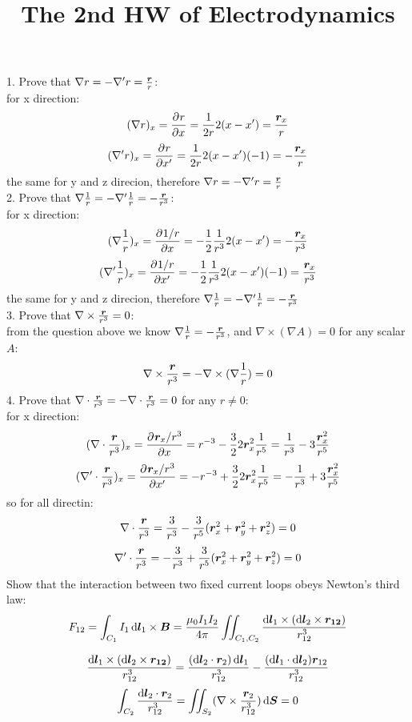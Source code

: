 \documentclass[UTF8,9pt]{ctexart}
\title{The 2nd HW of Electrodynamics}
\begin{document}
 
\maketitle
{}
1. Prove that $\nabla r=-\nabla'r=\frac{\bm{r}}{r}$:\\
for x direction:
$$(\nabla r)_x=\frac{\partial^{} r}{\partial {x}^{}}=\frac{1}{2r}2(x-x')=\frac{\bm{r}_x}{r}$$
$$(\nabla' r)_x=\frac{\partial^{} r}{\partial {x'}^{}}=\frac{1}{2r}2(x-x')(-1)=-\frac{\bm{r}_x}{r}$$
the same for y and z direcion, therefore $\nabla r=-\nabla'r=\frac{\bm{r}}{r}$\\
2. Prove that $\nabla \frac{1}{r}=-\nabla'\frac{1}{r}=-\frac{\bm{r}}{r^3}$:\\
for x direction:
$$(\nabla \frac{1}{r})_x=\frac{\partial^{} 1/r}{\partial {x}^{}}=-\frac{1}{2}\frac{1}{r^3}2(x-x')=-\frac{\bm{r}_x}{r^3}$$
$$(\nabla' \frac{1}{r})_x=\frac{\partial^{} 1/r}{\partial {x'}^{}}=-\frac{1}{2}\frac{1}{r^3}2(x-x')(-1)=\frac{\bm{r}_x}{r^3}$$
the same for y and z direcion, therefore $\nabla \frac{1}{r}=-\nabla'\frac{1}{r}=-\frac{\bm{r}}{r^3}$\\
3. Prove that $\nabla \times \frac{\bm{r}}{r^3}=0$:\\
from the question above we know $\nabla \frac{1}{r}=-\frac{\bm{r}}{r^3}$, and $\nabla \times (\nabla A)=0$ for any scalar $A$:
$$\nabla \times \frac{\bm{r}}{r^3}=-\nabla \times (\nabla \frac{1}{r})=0$$
4. Prove that $\nabla \cdot \frac{\bm{r}}{r^3}=-\nabla \cdot \frac{\bm{r}}{r^3}=0$ for any $r\neq 0$:\\
for x direction:
$$(\nabla \cdot \frac{\bm{r}}{r^3})_x=\frac{\partial^{} \bm{r}_x/r^3}{\partial {x}^{}}=r^{-3}-\frac{3}{2}2\bm{r}_x^2\frac{1}{r^5}=\frac{1}{r^3}-3\frac{\bm{r}_x^2}{r^5}$$
$$(\nabla' \cdot \frac{\bm{r}}{r^3})_x=\frac{\partial^{} \bm{r}_x/r^3}{\partial {x'}^{}}=-r^{-3}+\frac{3}{2}2\bm{r}_x^2\frac{1}{r^5}=-\frac{1}{r^3}+3\frac{\bm{r}_x^2}{r^5}$$
so for all directin:
$$\nabla \cdot \frac{\bm{r}}{r^3} = \frac{3}{r^3}-\frac{3}{r^5}(\bm{r}_x^2+\bm{r}_y^2+\bm{r}_z^2)=0$$
$$\nabla' \cdot \frac{\bm{r}}{r^3} = -\frac{3}{r^3}+\frac{3}{r^5}(\bm{r}_x^2+\bm{r}_y^2+\bm{r}_z^2)=0$$
Show that the interaction between two fixed current loops obeys Newton’s third law:
$$F_{12}=\int_{C_1} I_1\mathop{}\!\mathrm{d} \bm{l}_1\times \bm{B}=\frac{\mu_0I_1I_2}{4\pi}\iint_{C_1,C_2}\frac{\mathop{}\!\mathrm{d} \bm{l}_1\times(\mathop{}\!\mathrm{d}\bm{l}_2\times \bm{r_{12}})}{r_{12}^3}$$

$$\frac{\mathop{}\!\mathrm{d} \bm{l}_1\times(\mathop{}\!\mathrm{d}\bm{l}_2\times \bm{r_{12}})}{r_{12}^3}=\frac{(\mathop{}\!\mathrm{d}\bm{l}_2\cdot\bm{r}_2)\mathop{}\!\mathrm{d}\bm{l}_1}{r_{12}^3}-\frac{(\mathop{}\!\mathrm{d}\bm{l}_1\cdot\mathop{}\!\mathrm{d}\bm{l}_2)\bm{r}_{12}}{r_{12}^3}$$
$$\int_{C_2}\frac{\mathop{}\!\mathrm{d}\bm{l}_2\cdot\bm{r}_2}{r_{12}^3}=\iint_{S_2}(\nabla\times \frac{\bm{r}_2}{r_{12}^3})\mathop{}\!\mathrm{d} \bm{S}=0$$
\end{document}
